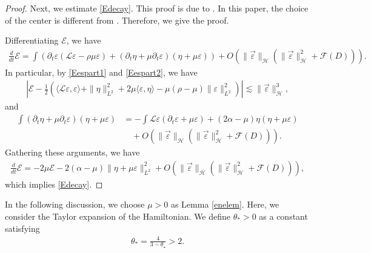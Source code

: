 \documentclass[reqno]{amsart}
\theoremstyle{plain}
\theoremstyle{definition}
\numberwithin{equation}{section}
\newcommand{\1}{\mathbbm{1}}
\begin{document}
\begin{proof}
Next, we estimate \eqref{Edecay}. This proof is due to \cite[Lemma 2.6]{CMYZ}. In this paper, the choice of the center is different from \cite{CMYZ}. Therefore, we give the proof.

Differentiating $\mathcal{E}$, we have
\begin{align*}
\frac{d}{dt}\mathcal{E}=\int \left({\partial}_t\varepsilon(\mathcal{L}\varepsilon-\rho \mu \varepsilon)+({\partial}_t\eta+\mu {\partial}_t\varepsilon)(\eta+\mu\varepsilon)\right)+O(\|\vec{\varepsilon}\|_{\mathcal{H}}(\|\vec{\varepsilon}\|_{\mathcal{H}}^2+\mathcal{F}(D))).
\end{align*}
In particular, by \eqref{Eespart1} and \eqref{Eespart2}, we have
\begin{align*}
\left|\mathcal{E}-\frac{1}{2}(\langle \mathcal{L}\varepsilon,\varepsilon\rangle +\|\eta\|_{L^2}^2+2\mu \langle \varepsilon,\eta\rangle -\mu(\rho-\mu)\|\varepsilon\|_{L^2}^2)\right|\lesssim \|\vec{\varepsilon}\|_{\mathcal{H}}^3,
\end{align*}
and
\begin{align*}
\int ({\partial}_t\eta+\mu {\partial}_t\varepsilon)(\eta+\mu\varepsilon)&=-\int \mathcal{L}\varepsilon({\partial}_t\varepsilon+\mu \varepsilon)+(2\alpha-\mu)\eta(\eta+\mu\varepsilon)
\\
&\quad+O(\|\vec{\varepsilon}\|_{\mathcal{H}}(\|\vec{\varepsilon}\|_{\mathcal{H}}^2+\mathcal{F}(D))).
\end{align*}
Gathering these arguments, we have
\begin{align*}
\frac{d}{dt}\mathcal{E}=-2\mu \mathcal{E}-2(\alpha-\mu)\|\eta+\mu \varepsilon\|_{L^2}^2+O(\|\vec{\varepsilon}\|_{\mathcal{H}}(\|\vec{\varepsilon}\|_{\mathcal{H}}^2+\mathcal{F}(D))),
\end{align*}
which implies \eqref{Edecay}.
\end{proof}
In the following discussion, we choose $\mu>0$ as Lemma \ref{enelem}. Here, we consider the Taylor expansion of the Hamiltonian. We define $\theta_{\ast}>0$ as a constant satisfying
\begin{align}\label{thetaast}
\theta_{\ast}=\frac{4}{3-\theta_{\star}}>2.
\end{align}
\end{document}
